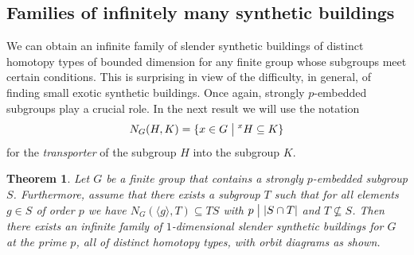 \documentclass[12pt]{amsart}
\theoremstyle{plain}
\newtheorem{theorem}{Theorem}[section]
\theoremstyle{definition}
\theoremstyle{remark}
\numberwithin{equation}{section}
\begin{document}
\subsection{Families of infinitely many synthetic buildings}
\label{infinite-family-subsection}

We can obtain an infinite family of slender synthetic buildings of distinct homotopy types of bounded dimension for any finite group whose subgroups meet certain conditions. This is surprising in view of the difficulty, in general, of finding small exotic synthetic buildings. Once again, strongly $p$-embedded subgroups play a crucial role. 
In the next result we will use the notation
$$N_G(H,K)=\{x\in G\bigm| {}^xH\subseteq K\}$$
for the \textit{transporter} of the subgroup $H$ into the subgroup $K$.

\begin{theorem}\label{thm:infiniteGgraphs}
    Let $G$ be a finite group that contains a strongly $p$-embedded subgroup $S$. Furthermore, assume that there exists a subgroup $T$ such that for all elements $g\in S$ of order $p$ we have $N_G(\langle g\rangle,T)\subseteq TS$ with $p \bigm| |S\cap T|$ and $T\not\subseteq S$. Then there exists an infinite family of $1$-dimensional slender synthetic buildings for $G$ at the prime $p$, all of distinct homotopy types, with orbit diagrams as shown.

\begin{figure}[H]
\label{fig:pinwheelG}
    \begin{center}
    \end{center}
    \end{figure}
\end{theorem}
\end{document}
